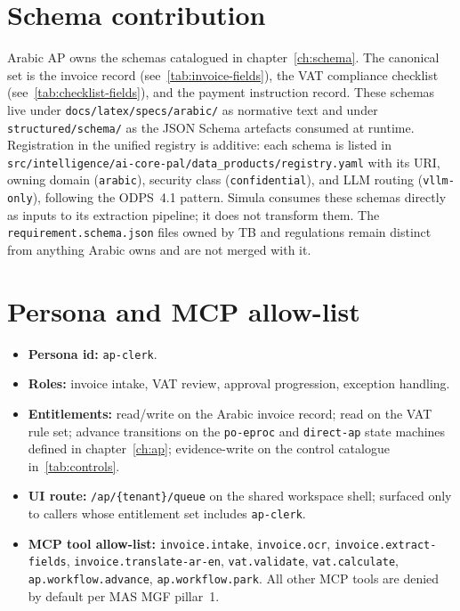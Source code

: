\documentclass[11pt,a4paper,twoside]{report}
\begin{document}
\section{Schema contribution}
\label{sec:agent-schema-contrib}
Arabic AP owns the schemas catalogued in chapter~\ref{ch:schema}. The
canonical set is the invoice record (see~\ref{tab:invoice-fields}),
the VAT compliance checklist (see~\ref{tab:checklist-fields}), and the
payment instruction record. These schemas live under
\texttt{docs/latex/specs/arabic/} as normative text and under
\texttt{structured/schema/} as the JSON Schema artefacts consumed at
runtime. Registration in the unified registry is additive: each
schema is listed in
\texttt{src/intelligence/ai-core-pal/data\_products/registry.yaml}
with its URI, owning domain (\texttt{arabic}), security class
(\texttt{confidential}), and LLM routing
(\texttt{vllm-only}), following the ODPS~4.1 pattern. Simula consumes
these schemas directly as inputs to its extraction pipeline; it does
not transform them. The \texttt{requirement.schema.json} files owned
by TB and regulations remain distinct from anything Arabic owns and
are not merged with it.

\section{Persona and MCP allow-list}
\label{sec:agent-persona}
\begin{itemize}
\item \textbf{Persona id:} \texttt{ap-clerk}.
\item \textbf{Roles:} invoice intake, VAT review, approval
progression, exception handling.
\item \textbf{Entitlements:} read/write on the Arabic invoice
record; read on the VAT rule set; advance transitions on the
\texttt{po-eproc} and \texttt{direct-ap} state machines defined
in chapter~\ref{ch:ap}; evidence-write on the control catalogue
in~\ref{tab:controls}.
\item \textbf{UI route:} \texttt{/ap/\{tenant\}/queue} on the shared
workspace shell; surfaced only to callers whose entitlement set
includes \texttt{ap-clerk}.
\item \textbf{MCP tool allow-list:}
\texttt{invoice.intake}, \texttt{invoice.ocr},
\texttt{invoice.extract-fields},
\texttt{invoice.translate-ar-en}, \texttt{vat.validate},
\texttt{vat.calculate}, \texttt{ap.workflow.advance},
\texttt{ap.workflow.park}. All other MCP tools are denied by
default per MAS MGF pillar~1.
\end{itemize}
\end{document}
